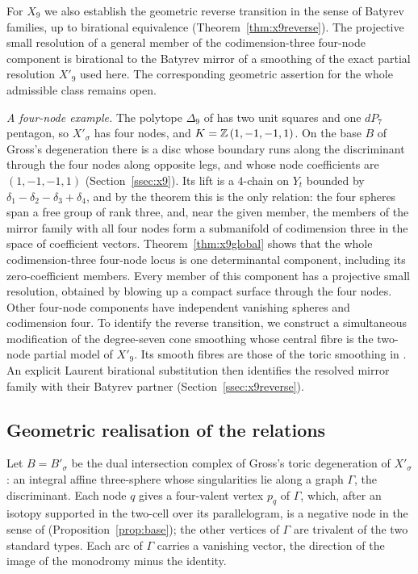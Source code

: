 For $X_9$ we also establish the geometric reverse transition in the sense of Batyrev families, up to
birational equivalence (Theorem~\ref{thm:x9reverse}). The projective small resolution of a general member of the
codimension-three four-node component is birational to the Batyrev mirror of a smoothing of the exact partial resolution $X'_9$ used here.
The corresponding geometric assertion for the whole admissible class remains open.

\emph{A four-node example.} The polytope $\Delta_9$ of \cite{Paper5} has two unit squares and one
$dP_7$ pentagon, so $X'_\sigma$ has four nodes, and
$K=\mathbb Z\,(1,-1,-1,1)$. On the base $B$ of Gross's degeneration there is a disc whose boundary runs along the discriminant
through the four nodes along opposite legs, and whose node coefficients are $(1,-1,-1,1)$
(Section~\ref{ssec:x9}). Its lift is a $4$-chain on $Y_t$ bounded by $\delta_1-\delta_2-\delta_3+\delta_4$, and by the
theorem this is the only relation: the four spheres span a free group of rank three, and, near the given member, the
members of the mirror family with all four nodes form a submanifold of codimension three in the space of coefficient
vectors. Theorem~\ref{thm:x9global} shows that the whole codimension-three four-node locus is one determinantal
component, including its zero-coefficient members. Every member of this component has a projective small resolution,
obtained by blowing up a compact surface through the four nodes. Other four-node components have independent
vanishing spheres and codimension four. To identify the reverse transition, we construct a simultaneous modification
of the degree-seven cone smoothing whose central fibre is the two-node partial model of $X'_9$. Its smooth fibres
are those of the toric smoothing in \cite{Paper5}. An explicit Laurent birational substitution then identifies the
resolved mirror family with their Batyrev partner (Section~\ref{ssec:x9reverse}).

\subsection{Geometric realisation of the relations}
Let $B=B'_\sigma$ be the dual intersection complex of Gross's toric degeneration
of $X'_\sigma$ \cite{Gross2005}: an integral affine three-sphere whose singularities lie along a graph $\Gamma$, the
discriminant. Each node $q$ gives a four-valent vertex $p_q$ of $\Gamma$, which, after an isotopy supported in the two-cell over its
parallelogram, is a negative node in the sense of \cite{CBM} (Proposition~\ref{prop:base}); the other vertices of $\Gamma$ are trivalent of the two standard types. Each arc
of $\Gamma$ carries a vanishing vector, the direction of the image of the monodromy minus the identity.


